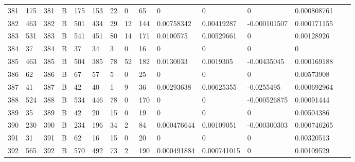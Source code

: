 \begin{longtable}{lllllllllllllll}
	381 & 175               & 381 & B   & 175               & 153               & 22                & 0    & 65         & 0              & 0              & 0             & 0.000808761  \\
	382 & 463               & 382 & B   & 501               & 434               & 29                & 12   & 144        & 0.00758342     & 0.00419287     & -0.000101507  & 0.000171155  \\
	383 & 531               & 383 & B   & 541               & 451               & 80                & 14   & 171        & 0.0100575      & 0.00529661     & 0             & 0.00128926   \\
	384 & 37                & 384 & B   & 37                & 34                & 3                 & 0    & 16         & 0              & 0              & 0             & 0            \\
	385 & 463               & 385 & B   & 504               & 385               & 78                & 52   & 182        & 0.0130033      & 0.0019305      & -0.00435045   & 0.000169188  \\
	386 & 62                & 386 & B   & 67                & 57                & 5                 & 0    & 25         & 0              & 0              & 0             & 0.00573908   \\
	387 & 41                & 387 & B   & 42                & 40                & 1                 & 9    & 36         & 0.00293638     & 0.00625355     & -0.0255495    & 0.000692964  \\
	388 & 524               & 388 & B   & 534               & 446               & 78                & 0    & 170        & 0              & 0              & -0.000526875  & 0.00091444   \\
	389 & 35                & 389 & B   & 42                & 20                & 15                & 0    & 19         & 0              & 0              & 0             & 0.00504386   \\
	390 & 230               & 390 & B   & 234               & 196               & 34                & 2    & 84         & 0.000476644    & 0.00109051     & -0.000300303  & 0.000746265  \\
	391 & 31                & 391 & B   & 62                & 16                & 15                & 0    & 20         & 0              & 0              & 0             & 0.00320513   \\
	392 & 565               & 392 & B   & 570               & 492               & 73                & 2    & 190        & 0.000491884    & 0.000741015    & 0             & 0.00109529   \\

\end{longtable}
